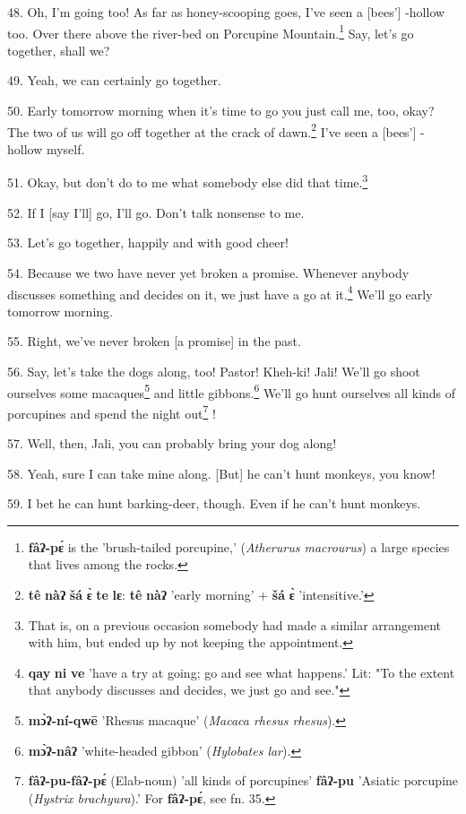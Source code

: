 48. Oh, I'm going too! As far as honey-scooping goes, I've seen a [bees'] -hollow
too. Over there above the river-bed on Porcupine Mountain.\footnote{\textbf{fâʔ-pɛ́} is the 'brush-tailed porcupine,' (\textit{Atherurus macrourus}) a large species that lives among the rocks.} Say, let's go together,
shall we?

49. Yeah, we can certainly go together.

50. Early tomorrow morning when it's time to go you just call me, too, okay? The
two of us will go off together at the crack of dawn.\footnote{\textbf{tê} \textbf{nàʔ} \textbf{šá} \textbf{ɛ̀} \textbf{te} \textbf{lɛ}: \textbf{tê} \textbf{nàʔ} 'early morning' + \textbf{šá} \textbf{ɛ̀} 'intensitive.'} I've seen a [bees'] -hollow
myself.

51. Okay, but don't do to me what somebody else did that time.\footnote{That is, on a previous occasion somebody had made a similar arrangement with him, but ended up by not keeping the appointment.}

52. If I [say I'll] go, I'll go. Don't talk nonsense to me.

53. Let's go together, happily and with good cheer!

54. Because we two have never yet broken a promise. Whenever anybody discusses
something and decides on it, we just have a go at it.\footnote{\textbf{qay} \textbf{ni} \textbf{ve} 'have a try at going; go and see what happens.' Lit: "To the extent that anybody discusses and decides, we just go and see."} We'll go early tomorrow
morning.

55. Right, we've never broken [a promise] in the past.

56. Say, let's take the dogs along, too! Pastor! Kheh-ki! Jali! We'll go shoot
ourselves some macaques\footnote{\textbf{mɔ̀ʔ-ní-qwē} 'Rhesus macaque' (\textit{Macaca rhesus rhesus}).} and little gibbons.\footnote{\textbf{mɔ̀ʔ-nâʔ} 'white-headed gibbon' (\textit{Hylobates lar}).} We'll go hunt ourselves all
kinds of porcupines and spend the night out\footnote{\textbf{fâʔ-pu-fâʔ-pɛ́} (Elab-noun) 'all kinds of porcupines' \textbf{fâʔ-pu} 'Asiatic porcupine (\textit{Hystrix brachyura}).' For \textbf{fâʔ-pɛ́}, see fn. 35.} !

57. Well, then, Jali, you can probably bring your dog along!

58. Yeah, sure I can take mine along. [But] he can't hunt monkeys, you know!

59. I bet he can hunt barking-deer, though. Even if he can't hunt monkeys.

